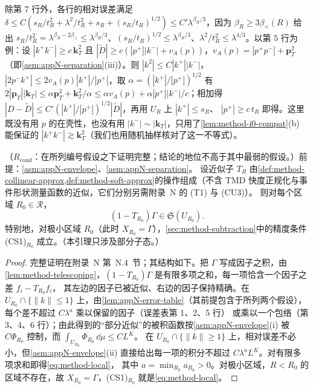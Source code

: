 除第 7 行外，各行的相对误差满足 $\delta\le C(s_R/t_R^2+\lambda^2/t_R^2+s_R+(s_R/t_R)^{1/2})\le C'\lambda^{\beta_R/3}$，因为 $\beta_R\ge3\beta_<(R)$ 给出
$s_R/t_R^2=\lambda^{\beta_R-2\beta_<}\le\lambda^{\beta_R/3}$、$(s_R/t_R)^{1/2}\le\lambda^{\beta_R/3}$、$\lambda^2/t_R^2\le\lambda^{4/3}$。以第 5 行为例：设 $|k^+k^-|\ge c\,\mathbf k_T^2$ 且
$|\tilde D|\ge c(|p^+||k^-|+v_A(p))$，$v_A(p)=|p^+p^-|+\mathbf p_T^2$（即\cref{asm:appN-separation}(iii)）。则 $|k^2|\le C|k^+||k^-|$，$|2p^-k^+|\le2v_A(p)|k^+|/|p^+|$，取 $\alpha=(|k^+|/|p^+|)^{1/2}$ 有
$2|\mathbf p_T||\mathbf k_T|\le\alpha\mathbf p_T^2+\mathbf k_T^2/\alpha\le\alpha v_A(p)+\alpha|p^+||k^-|/c$；相加得 $|D-\tilde D|\le C'(|k^+|/|p^+|)^{1/2}|\tilde D|$，再用 $U_R$ 上 $|k^+|\le s_R$、
$|p^+|\ge c\,t_R$ 即得。这里既没有用 $p$ 的在壳性，也没有用 $|k^-|\sim|\mathbf k_T|$，只用了\cref{lem:method-i0-compat}(b) 能保证的 $|k^+k^-|\gtrsim\mathbf k_T^2$（我们也用随机抽样核对了这一不等式）。%

\begin{lemma}\label{lem:method-local-accuracy}
（$R_{\mathrm{cond}}$：在所列编号假设之下证明完整；结论的地位不高于其中最弱的假设。）前提：\cref{asm:appN-envelope}、\cref{asm:appN-separation}。
设近似子 $T_R$ 由\cref{def:method-collinear-approx,def:method-soft-approx}的操作组成（不含 TMD 快度正规化与事件形状测量函数的近似，它们分别另需附录~N 的 (T1) 与 (CU3)）。
则对每个区域 $R_0\in\mathcal R$，
\begin{equation}\label{eq:method-local}
(1-T_{R_0})\Gamma\in\mathfrak S(U_{R_0}) .
\end{equation}
特别地，对极小区域 $R_0$（此时 $X_{R_0}=\Gamma$），\cref{sec:method-subtraction}中的精度条件 (CS1)$_{R_0}$ 成立。（本引理只涉及部分子态。）
\end{lemma}

\begin{proof}
完整证明在附录~N 第~N.4~节；其结构如下。把 $\Gamma$ 写成因子之积，由\cref{lem:method-telescoping}，$(1-T_{R_0})\Gamma$ 是有限多项之和，每一项恰含一个因子之差 $f_i-T_{R_0}f_i$，
其左边的因子已被近似、右边的因子保持精确。在 $U_{R_0}\cap\{\|k\|\le1\}$ 上，由\cref{lem:appN-error-table}（其前提包含于所列两个假设），每个差不超过 $C\lambda^a$ 乘以保留的因子（误差表第 1、2、5 行）
或乘以一个包络（第 3、4、6 行）；由此得到的“部分近似”的被积函数按\cref{asm:appN-envelope}(i) 被 $C\Phi_{R_0}$ 控制，而 $\int_{U_{R_0}}\Phi_{R_0}\,\dd\mu\le CL^K$。
在 $U_{R_0}\cap\{\|k\|\ge1\}$ 上，相对误差不必小，但\cref{asm:appN-envelope}(ii) 直接给出每一项的积分不超过 $C\lambda^aL^K$。对有限多项求和即得\cref{eq:method-local}，
其中 $a=\min_{R_0}a_{R_0}>0$。对极小区域，$R<R_0$ 的区域不存在，故 $X_{R_0}=\Gamma$，(CS1)$_{R_0}$ 就是\cref{eq:method-local}。
\end{proof}

